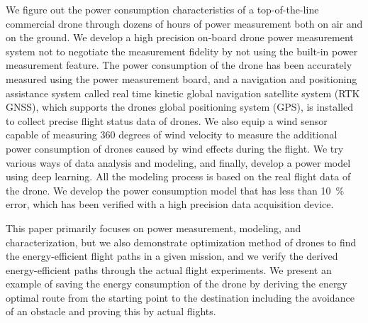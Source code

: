 \documentclass[journal]{./template/IEEEtran}
\begin{document}
We figure out the power consumption characteristics of a top-of-the-line commercial drone through dozens of hours of power measurement both on air and on the ground.
We develop a high precision on-board drone power measurement system not to negotiate the measurement fidelity by not using the built-in power measurement feature. 
The power consumption of the drone has been accurately measured using the power measurement board, and a navigation and positioning assistance system called real time kinetic global navigation satellite system (RTK GNSS), which supports the drones global positioning system (GPS), is installed to collect precise flight status data of drones.
We also equip a wind sensor capable of measuring 360 degrees of wind velocity to measure the additional power consumption of drones caused by wind effects during the flight.
We try various ways of data analysis and modeling, and finally, develop a power model using deep learning.
All the modeling process is based on the real flight data of the drone. We develop the power consumption model that has less than 10~\% error, which has been verified with a high precision data acquisition device.

This paper primarily focuses on power measurement, modeling, and characterization, but we also demonstrate optimization method of drones to find the energy-efficient flight paths in a given mission, and we verify the derived energy-efficient paths through the actual flight experiments.
We present an example of saving the energy consumption of the drone by deriving the energy optimal route from the starting point to the destination including the avoidance of an obstacle and proving this by actual flights.
\end{document}
